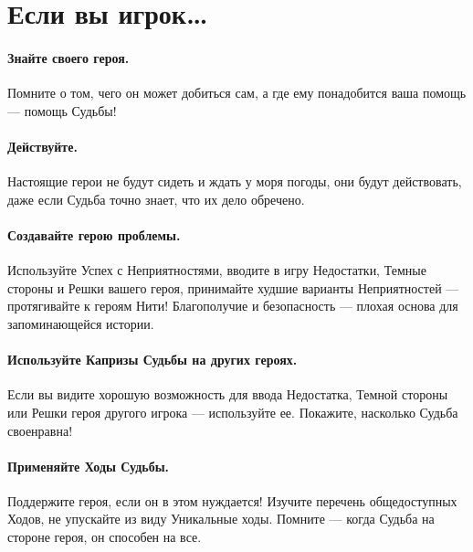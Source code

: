 \section*{Если вы игрок…}

\paragraph{Знайте своего героя.} Помните о том, чего он может добиться сам, а где ему понадобится ваша помощь — помощь Судьбы!
\paragraph{Действуйте.} Настоящие герои не будут сидеть и ждать у моря погоды, они будут действовать, даже если Судьба точно знает, что их дело обречено.
\paragraph{Создавайте герою проблемы.} Используйте Успех с Неприятностями, вводите в игру Недостатки, Темные стороны и Решки вашего героя, принимайте худшие варианты Неприятностей — протягивайте к героям Нити! Благополучие и безопасность — плохая основа для запоминающейся истории.
\paragraph{Используйте Капризы Судьбы на других героях.} Если вы видите хорошую возможность для ввода Недостатка, Темной стороны или Решки героя другого игрока — используйте ее. Покажите, насколько Судьба своенравна!
\paragraph{Применяйте Ходы Судьбы.} Поддержите героя, если он в этом нуждается! Изучите перечень общедоступных Ходов, не упускайте из виду Уникальные ходы. Помните — когда Судьба на стороне героя, он способен на все.
